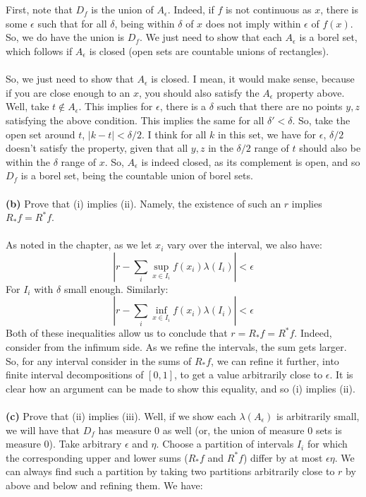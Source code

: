 \documentclass[12pt,a4paper]{article}
\newcommand{\1}[1]{\mathbbm{1}\left\{ #1 \right\}}
\begin{document}
\\\\
First, note that $D_f$ is the union of $A_\epsilon$. Indeed, if $f$ is not continuous as $x$, there is some $\epsilon$ such that for all $\delta$, being within $\delta$ of $x$ does not imply within $\epsilon$ of $f(x)$. So, we do have the union is $D_f$. We just need to show that each $A_\epsilon$ is a borel set, which follows if $A_\epsilon$ is closed (open sets are countable unions of rectangles).
\\\\
So, we just need to show that $A_\epsilon$ is closed. I mean, it would make sense, because if you are close enough to an $x$, you should also satisfy the $A_\epsilon$ property above. Well, take $t \not\in A_\epsilon$. This implies for $\epsilon$, there is a $\delta$ such that there are no points $y,z$ satisfying the above condition. This implies the same for all $\delta' < \delta$. So, take the open set around $t$, $|k - t| < \delta/2$. I think for all $k$ in this set, we have for $\epsilon$, $\delta/2$ doesn't satisfy the property, given that all $y,z$ in the $\delta/2$ range of $t$ should also be within the $\delta$ range of $x$. So, $A_\epsilon$ is indeed closed, as its complement is open, and so $D_f$ is a borel set, being the countable union of borel sets.
\\\\
\textbf{(b)} Prove that (i) implies (ii). Namely, the existence of such an $r$ implies $R_*f = R^*f$. 
\\\\
As noted in the chapter, as we let $x_i$ vary over the interval, we also have:
$$
	\left|r - \sum_i \sup_{x \in I_i} f(x_i)\lambda(I_i)\right| < \epsilon
$$
For $I_i$ with $\delta$ small enough. Similarly:
$$
	\left|r - \sum_i \inf_{x \in I_i} f(x_i)\lambda(I_i)\right| < \epsilon
$$
Both of these inequalities allow us to conclude that $r = R_*f = R^*f$. Indeed, consider from the infimum side. As we refine the intervals, the sum gets larger. So, for any interval consider in the sums of $R_*f$, we can refine it further, into finite interval decompositions of $[0,1]$, to get a value arbitrarily close to $\epsilon$. It is clear how an argument can be made to show this equality, and so (i) implies (ii).
\\\\
\textbf{(c)} Prove that (ii) implies (iii). Well, if we show each $\lambda(A_\epsilon)$ is arbitrarily small, we will have that $D_f$ has measure 0 as well (or, the union of measure 0 sets is measure 0). Take arbitrary $\epsilon$ and $\eta$. Choose a partition of intervals $I_i$ for which the corresponding upper and lower sums ($R_*f$ and $R^*f$) differ by at most $\epsilon\eta$. We can always find such a partition by taking two partitions arbitrarily close to $r$ by above and below and refining them. We have:
\end{document}
